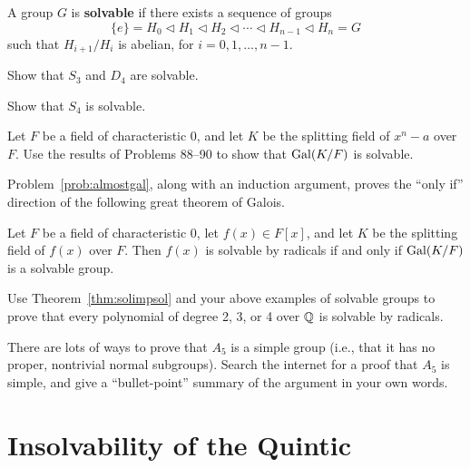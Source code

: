 \begin{definition}
    A group $G$ is \textbf{solvable} if there exists a sequence of groups
    $$\{e\}=H_0\lhd H_1 \lhd H_2\lhd \cdots \lhd H_{n-1}\lhd H_n=G$$
    such that $H_{i+1}/H_{i}$ is abelian,
    for $i=0,1,\ldots,n-1$.
\end{definition}

\begin{problem}
    Show that $S_3$ and $D_4$ are solvable.
\end{problem}



\begin{problem}
    Show that $S_4$ is solvable.
\end{problem}



\begin{problem}\label{prob:almostgal}
    Let $F$ be a field of characteristic 0, and let $K$ be the splitting field of $x^n-a$ over $F$.  Use the results of Problems 88--90 to show that $\operatorname{Gal}(K/F)$ is solvable.
\end{problem}

Problem~\ref{prob:almostgal}, along with an induction argument, proves the ``only if'' direction of the following great theorem of Galois.

\begin{theorem}[Galois]
    Let $F$ be a field of characteristic 0, let $f(x)\in F[x]$, and let $K$ be the splitting field of $f(x)$ over $F$. Then $f(x)$ is solvable by radicals if and only if $\operatorname{Gal}(K/F)$ is a solvable group.
    \label{thm:solimpsol}
\end{theorem}



\begin{problem}
    Use Theorem~\ref{thm:solimpsol} and your above examples of solvable groups to prove that every polynomial of degree 2, 3, or 4 over $\mathbb{Q}$ is solvable by radicals.
\end{problem}



\begin{problem}
    There are lots of ways to prove that $A_5$ is a simple group (i.e., that it has no proper, nontrivial normal subgroups). Search the internet for a proof that $A_5$ is simple, and give a ``bullet-point'' summary of the argument in your own words.
\end{problem}


\section{Insolvability of the Quintic}

